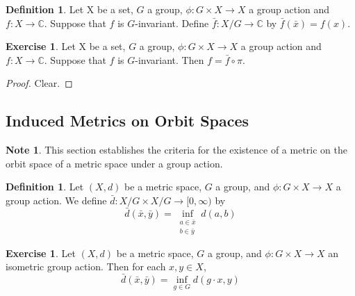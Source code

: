 \documentclass[12pt]{amsart}
\theoremstyle{definition}
\newtheorem{defn}[definition]{Definition}
\newtheorem{note}[definition]{Note}
\newtheorem{ex}[definition]{Exercise}
\newcommand{\C}{\mathbb{C}}
\newcommand{\Rg}{[0,\infty)}
\newcommand{\lex}[1]{\label{ex:#1}}
\newcommand{\ld}[1]{\label{defn:#1}}
\begin{document}
	\begin{defn}
	Let X be a set, $G$ a group, $\phi: G \times X \rightarrow X$ a group action and $f:X \rightarrow \C$. Suppose that $f$ is $G$-invariant. Define $\bar{f}:X/ G \rightarrow \C$ by $\bar{f}(\bar{x}) = f(x)$. 
	\end{defn}
	
	\begin{ex}
	Let X be a set, $G$ a group, $\phi: G \times X \rightarrow X$ a group action and $f:X \rightarrow \C$. Suppose that $f$ is $G$-invariant. Then $f = \bar{f} \circ \pi$. 
	\end{ex}
	
	\begin{proof}
	Clear.
	\end{proof}
	
	
	
	
	
	
	
	
	
	\newpage
	\subsection{Induced Metrics on Orbit Spaces}
	
	\begin{note}
	This section establishes the criteria for the existence of a metric on the orbit space of a metric space under a group action. 
	\end{note}
	
	\begin{defn} \ld{}
	Let $(X, d)$ be a metric space, $G$ a group, and $\phi: G \times X \rightarrow X$ a group action. We define 
	$\bar{d}: X/G \times X / G \rightarrow \Rg$ by 
	$$\bar{d}(\bar{x}, \bar{y}) = \inf_{\substack{a \in \bar{x} \\ b \in \bar{y}}} d(a,b) $$
	\end{defn}
	
	\begin{ex} \lex{}
	Let $(X, d)$ be a metric space, $G$ a group, and $\phi: G \times X \rightarrow X$ an isometric group action. Then for each $x, y \in X$, $$\bar{d}(\bar{x}, \bar{y}) = \inf_{g \in G} d(g \cdot x, y)$$
	\end{ex}
	
\end{document}
